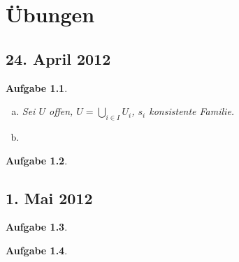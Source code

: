 \documentclass[a4paper,12pt]{report}
\makeatletter
\theoremstyle{break}
\theoremstyle{nonumberbreak}
\theoremstyle{nonumberplain}
\def\@seccntformat#1{\@ifundefined{#1@cntformat}%
{\csname the#1\endcsname\quad}%
{\csname #1@cntformat\endcsname}%
}
\def\section@cntformat{\S\@arabic\c@section\quad}
\makeatother
\begin{document}
\def\indexspace{\par\medskip}

\chapter{\"Ubungen}
\makeatletter
\def\@seccntformat#1{\@ifundefined{#1@cntformat}%
{\csname the#1\endcsname\quad}%
{\csname #1@cntformat\endcsname}%
}
\def\section@cntformat{\"Ubung \@arabic\c@section \mbox{ vom }}
\theoremstyle{break}
	\newtheorem{Aufg}{Aufgabe}
	\newtheorem{Loes}{L\"osung}

\setcounter{section}{-1}


\section{24. April 2012}
\setcounter{Aufg}{0} %
\begin{Aufg}\begin{enumerate}[a)]
\item
	Sei $U$ offen, $U = \bigcup\limits_{i\in I} U_i$, $s_i$ konsistente Familie.
	
\item
\end{enumerate}\end{Aufg}

\begin{Aufg}

\end{Aufg}

\newpage
\section{1. Mai 2012}
\setcounter{Aufg}{0}
\begin{Aufg}

\end{Aufg}

\begin{Aufg}

\end{Aufg}
\end{document}
